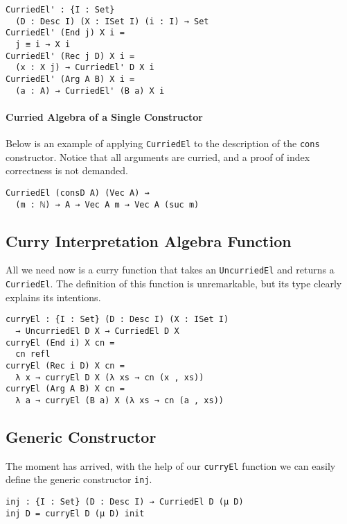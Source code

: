 \documentclass[preprint,nonatbib]{sigplanconf}
\begin{document}
\begin{verbatim}
CurriedEl' : {I : Set}
  (D : Desc I) (X : ISet I) (i : I) → Set
CurriedEl' (End j) X i =
  j ≡ i → X i
CurriedEl' (Rec j D) X i =
  (x : X j) → CurriedEl' D X i
CurriedEl' (Arg A B) X i =
  (a : A) → CurriedEl' (B a) X i
\end{verbatim}

\paragraph{Curried Algebra of a Single Constructor}

Below is an example of applying {\tt CurriedEl} to the
description of the {\tt cons} constructor. Notice that all arguments
are curried, and a proof of index correctness is not demanded.

\begin{verbatim}
CurriedEl (consD A) (Vec A) ⇝
  (m : ℕ) → A → Vec A m → Vec A (suc m)
\end{verbatim}

\subsection{Curry Interpretation Algebra Function}

All we need now is a curry function that takes an
{\tt UncurriedEl} and returns a {\tt CurriedEl}. The definition of
this function is unremarkable, but its type clearly explains its
intentions.

\begin{verbatim}
curryEl : {I : Set} (D : Desc I) (X : ISet I)
  → UncurriedEl D X → CurriedEl D X
curryEl (End i) X cn =
  cn refl
curryEl (Rec i D) X cn =
  λ x → curryEl D X (λ xs → cn (x , xs))
curryEl (Arg A B) X cn =
  λ a → curryEl (B a) X (λ xs → cn (a , xs))
\end{verbatim}

\subsection{Generic Constructor}

The moment has arrived, with the help of our {\tt curryEl} function we
can easily define the generic constructor {\tt inj}.

\begin{verbatim}
inj : {I : Set} (D : Desc I) → CurriedEl D (μ D)
inj D = curryEl D (μ D) init
\end{verbatim}
\end{document}
